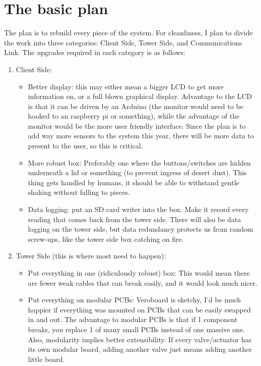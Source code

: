 \documentclass{article}
\begin{document}
    \section{The basic plan}
        The plan is to rebuild every piece of the system. For cleanliness, I plan to divide the work into three categories: Client Side, Tower Side, and Communications Link. The upgrades required in each category is as follows:
        \begin{enumerate}
            \item Client Side:
            \begin{itemize}
                \item Better display: this may either mean a bigger LCD to get more information on, or a full blown graphical display. Advantage to the LCD is that it can be driven by an Arduino (the monitor would need to be hooked to an raspberry pi or something), while the advantage of the monitor would be the more user friendly interface. Since the plan is to add way more sensors to the system this year, there will be more data to present to the user, so this is critical.
                \item More robust box: Preferably one where the buttons/switches are hidden underneath a lid or something (to prevent ingress of desert dust). This thing gets handled by humans, it should be able to withstand gentle shaking without falling to pieces.
                \item Data logging: put an SD card writer into the box. Make it record every reading that comes back from the tower side. There will also be data logging on the tower side, but data redundancy protects us from random screw-ups, like the tower side box catching on fire.
            \end{itemize}
            \item Tower Side (this is where most need to happen):
            \begin{itemize}
                \item Put everything in one (ridiculously robust) box: This would mean there are fewer weak cables that can break easily, and it would look much nicer.
                \item Put everything on modular PCBs: Veroboard is sketchy, I'd be much happier if everything was mounted on PCBs that can be easily swapped in and out. The advantage to modular PCBs is that if 1 component breaks, you replace 1 of many small PCBs instead of one massive one. Also, modularity implies better extensibility. If every valve/actuator has its own modular board, adding another valve just means adding another little board.

\end{itemize}
\end{enumerate}
\end{document}
